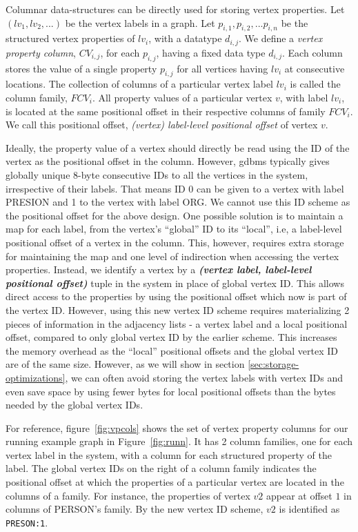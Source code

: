 Columnar data-structures can be directly used for storing vertex properties. Let $(lv_1, lv_2, ...)$ be the vertex labels in a graph. Let $p_{i,1},  p_{i,2}, ... p_{i, n}$ be the structured vertex properties of $lv_i$, with a datatype $d_{i,j}$. We define a \emph{vertex property column}, $CV_{i,j}$, for each $p_{i,j}$, having a fixed data type $d_{i,j}$. Each column stores the value of a single property $p_{i,j}$ for all vertices having $lv_i$ at consecutive locations. The collection of columns of a particular vertex label $lv_i$ is called the column family, $FCV_i$. All property values of a particular vertex $v$, with label $lv_i$, is located at the same positional offset in their respective columns of family $FCV_i$. We call this positional offset, \emph{(vertex) label-level positional offset} of vertex $v$.


Ideally, the property value of a vertex should directly be read using the ID of the vertex as the positional offset in the column. However, \gls{gdbms} typically gives globally unique 8-byte consecutive IDs to all the vertices in the system, irrespective of their labels. That means ID 0 can be given to a vertex with label PRESION and 1 to the vertex with label ORG. We cannot use this ID scheme as the positional offset for the above design. One possible solution is to maintain a map for each label, from the vertex's \enquote{global} ID to its \enquote{local}, i.e, a label-level positional offset of a vertex in the column. This, however, requires extra storage for maintaining the map and one level of indirection when accessing the vertex properties. Instead, we identify a vertex by a \emph{\textbf{(vertex label, label-level positional offset)}} tuple in the system in place of global vertex ID. This allows direct access to the properties by using the positional offset which now is part of the vertex ID. However, using this new vertex ID scheme requires materializing 2 pieces of information in the adjacency lists - a vertex label and a local positional offset, compared to only global vertex ID by the earlier scheme. This increases the memory overhead as the \enquote{local} positional offsets and the global vertex ID are of the same size. However, as we will show in section \ref{sec:storage-optimizations}, we can often avoid storing the vertex labels with vertex IDs and even save space by using fewer bytes for local positional offsets than the bytes needed by the global vertex IDs.

For reference, figure~\ref{fig:vpcols} shows the set of vertex property columns for our running example graph in Figure~\ref{fig:runn}. It has 2 column families, one for each vertex label in the system, with a column for each structured property of the label. The global vertex IDs on the right of a column family indicates the positional offset at which the properties of a particular vertex are located in the columns of a family. For instance, the properties of vertex $v2$ appear at offset $1$ in columns of PERSON's family. By the new vertex ID scheme, $v2$ is identified as \texttt{PRESON:1}. 

